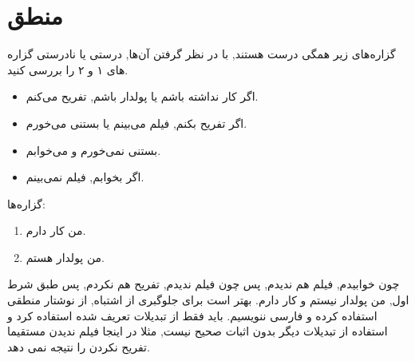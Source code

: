 \documentclass[11pt,largemargins]{h2wp}
\begin{document}
\chapter*{منطق}


\question


گزاره‌های زیر همگی درست هستند, با در نظر گرفتن آن‌ها, درستی یا نادرستی گزاره های ۱ و ۲ را بررسی کنید.
\begin{itemize}
\item اگر کار نداشته باشم یا پولدار باشم, تفریح می‌کنم.
\item اگر تفریح بکنم, فیلم می‌بینم یا بستنی می‌خورم.
\item بستنی نمی‌خورم و می‌خوابم.
\item اگر بخوابم, فیلم نمی‌بینم.
\end{itemize}
گزاره‌ها:
\begin{enumerate}
\item من کار دارم.
\item من پولدار هستم.
\end{enumerate}
\solution
چون خوابیدم, فیلم هم ندیدم, پس چون فیلم ندیدم, تفریح هم نکردم, پس طبق شرط اول, من پولدار نیستم و کار دارم.
\notes
{} بهتر است برای جلوگبری از اشتباه, از نوشتار منطقی استفاده کرده و فارسی ننویسیم.
 باید فقط از تبدیلات تعریف شده استفاده کرد و استفاده از تبدیلات دیگر بدون اثبات صحیح نیست, مثلا در اینجا فیلم ندیدن مستقیما تفریح نکردن را نتیجه نمی دهد.
 
\end{document}
